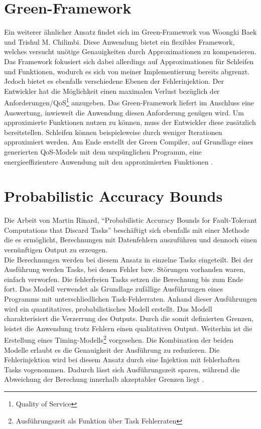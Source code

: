 \section{Green-Framework}
Ein weiterer \"ahnlicher Ansatz findet sich im Green-Framework von Woongki Baek und Trishul M. Chilimbi. Diese Anwendung bietet ein flexibles Framework, welches versucht un\"otige Genauigkeiten durch Approximationen zu kompensieren. Das Framework fokusiert sich dabei allerdings auf Approximationen f\"ur Schleifen und Funktionen, wodurch es sich von meiner Implementierung bereits abgrenzt. Jedoch bietet es ebenfalls verschiedene Ebenen der Fehlerinjektion. Der Entwickler hat die M\"oglichkeit einen maximalen Verlust bez\"uglich der Anforderungen/QoS\footnote{Quality of Service} anzugeben. Das Green-Framework liefert im Anschluss eine Auswertung, inwieweit die Anwendung diesen Anforderung gen\"ugen wird. Um approximierte Funktionen nutzen zu k\"onnen, muss der Entwickler diese zus\"atzlich bereitstellen. Schleifen k\"onnen beispielsweise durch weniger Iterationen approximiert werden. Am Ende erstellt der Green Compiler, auf Grundlage eines generierten QoS-Models mit dem ursp\"unglichen Programm, eine energieeffizientere Anwendung mit den approximierten Funktionen \cite{green}. 

\section{Probabilistic Accuracy Bounds}
Die Arbeit von Martin Rinard, ``Probabilistic Accuracy Bounds for Fault-Tolerant
Computations that Discard Tasks'' besch\"aftigt sich ebenfalls mit einer Methode die es erm\"oglicht,  Berechnungen mit Datenfehlern auszuführen und dennoch einen vern\"unftigen Output zu erzeugen. \\ 
Die Berechnungen werden bei diesem Ansatz in einzelne Tasks eingeteilt. Bei der Ausf\"uhrung werden Tasks, bei denen Fehler bzw. St\"orungen vorhanden waren, einfach verworfen. Die fehlerfreien Tasks setzen die Berechnung bis zum Ende fort. Das Modell verwendet als Grundlage zuf\"allige Ausf\"uhrungen eines Programms mit unterschliedlichen Task-Fehlerraten. Anhand dieser Ausführungen wird ein quantitatives, probabilistisches Modell erstellt. Das Modell charakterisiert die Verzerrung des Outputs. Durch die somit definierten Grenzen, leistet die Anwendung trotz Fehlern einen qualitativen Output. Weiterhin ist die Erstellung eines Timing-Modells\footnote{Ausf\"uhrungszeit als Funktion über Task Fehlerraten} vorgesehen. Die Kombination der beiden Modelle erlaubt es die Genauigkeit der Ausf\"uhrung zu reduzieren. Die Fehlerinjektion wird bei diesem Ansatz durch eine Injektion mit fehlerhaften Tasks vogenommen. Dadurch lässt sich Ausf\"uhrungszeit sparen, w\"ahrend die Abweichung der Berechung innerhalb akzeptabler Grenzen liegt \cite{Rinard06}. 


